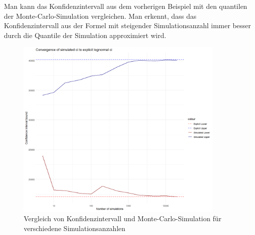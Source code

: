\begin{bsp}

Man kann das Konfidenzintervall aus dem vorherigen Beispiel mit den quantilen der Monte-Carlo-Simulation vergleichen.
Man erkennt, dass das Konfidenzintervall aus der Formel mit steigender Simulationsanzahl immer besser durch die Quantile der Simulation approximiert wird.

\begin{figure}[H]
    \centering
    \includegraphics[width=0.9\textwidth]{images/ci_comparison.png}
    \caption{Vergleich von Konfidenzintervall und Monte-Carlo-Simulation für verschiedene Simulationsanzahlen}
    \label{fig:ci_comparison}
\end{figure}

\end{bsp}